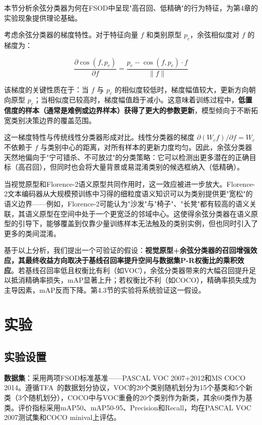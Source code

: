 \documentclass[zihao=5,a4paper,twocolumn]{ctexart}
\begin{document}
本节分析余弦分类器为何在FSOD中呈现"高召回、低精确"的行为特征，为第4章的实验现象提供理论基础。

考虑余弦分类器的梯度特性。对于特征向量 $f$ 和类别原型 $p_c$，余弦相似度对 $f$ 的梯度为：

\begin{equation}
\frac{\partial \cos(f, p_c)}{\partial f} = \frac{p_c - \cos(f, p_c) \cdot f}{\|f\|}
\label{eq:gradient}
\end{equation}

该梯度的关键性质在于：当 $f$ 与 $p_c$ 的相似度较低时，梯度幅值较大，更新方向朝向原型 $p_c$；当相似度已较高时，梯度幅值趋于减小。这意味着训练过程中，\textbf{低置信度的样本（通常是难例或边界样本）获得了更大的参数更新}，模型倾向于不断拓宽类别决策边界的覆盖范围。

这一梯度特性与传统线性分类器形成对比。线性分类器的梯度 $\partial (W_c f) / \partial f = W_c$ 不依赖于 $f$ 与类别中心的距离，对所有样本的更新力度均匀。因此，余弦分类器天然地偏向于"宁可错杀、不可放过"的分类策略：它可以检测出更多潜在的正确目标（高召回），但同时也会将大量背景或易混淆类别的候选框纳入（低精确）。

当视觉原型和Florence-2语义原型共同作用时，这一效应被进一步放大。Florence-2文本编码器从大规模预训练中习得的细粒度语义知识可以为类别提供更"宽松"的语义边界——例如，Florence-2可能认为"沙发"与"椅子"、"长凳"都有较高的语义关联，其语义原型在空间中处于一个更宽泛的邻域中心。这使得余弦分类器在语义原型的引导下，能够覆盖到仅靠少量训练样本无法触及的类别实例，但也同时引入了更多的类间混淆。

基于以上分析，我们提出一个可验证的假设：\textbf{视觉原型+余弦分类器的召回增强效应，其最终收益方向取决于基线召回率提升空间与数据集P-R权衡比的乘积效应}。若基线召回率低且权衡比有利（如VOC），余弦分类器带来的大幅召回提升足以抵消精确率损失，mAP显著上升；若权衡比不利（如COCO），精确率损失成为主导因素，mAP反而下降。第4.3节的实验将系统验证这一假设。


\section{实验}

\subsection{实验设置}

\textbf{数据集}：采用两项FSOD标准基准——PASCAL VOC 2007+2012和MS COCO 2014。遵循TFA~\cite{wang2020tfa}的数据划分协议，VOC的20个类别随机划分为15个基类和5个新类（3个随机划分），COCO中与VOC重叠的20个类别作为新类，其余60类作为基类。评价指标采用mAP50、mAP50-95、Precision和Recall，均在PASCAL VOC 2007测试集和COCO minival上评估。
\end{document}
